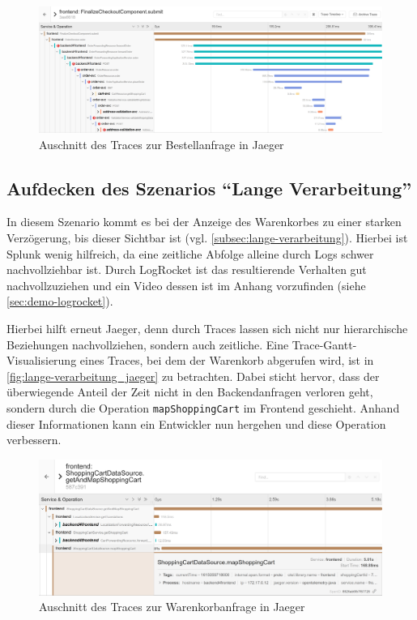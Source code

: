 \begin{figure}[H]
	\centering
	\includegraphics[width=1.00\linewidth]{img/05_ergebnis/ungueltige-adressen-sind-gueltig_jaeger-detail.png}
	\caption{Auschnitt des Traces zur Bestellanfrage in Jaeger}
	\label{fig:ungueltige-adressen-sind-gueltig_jaeger-detail}
\end{figure}

\subsection{Aufdecken des Szenarios \enquote{Lange Verarbeitung}}

In diesem Szenario kommt es bei der Anzeige des Warenkorbes zu einer starken Verzögerung, bis dieser Sichtbar ist (vgl. \autoref{subsec:lange-verarbeitung}). Hierbei ist Splunk wenig hilfreich, da eine zeitliche Abfolge alleine durch Logs schwer nachvollziehbar ist. Durch LogRocket ist das resultierende Verhalten gut nachvollzuziehen und ein Video dessen ist im Anhang vorzufinden (siehe \autoref{sec:demo-logrocket}).

Hierbei hilft erneut Jaeger, denn durch Traces lassen sich nicht nur hierarchische Beziehungen nachvollziehen, sondern auch zeitliche. Eine Trace-Gantt-Visualisierung eines Traces, bei dem der Warenkorb abgerufen wird, ist in \autoref{fig:lange-verarbeitung_jaeger} zu betrachten. Dabei sticht hervor, dass der überwiegende Anteil der Zeit nicht in den Backendanfragen verloren geht, sondern durch die Operation \texttt{mapShoppingCart} im Frontend geschieht. Anhand dieser Informationen kann ein Entwickler nun hergehen und diese Operation verbessern.

\begin{figure}[H]
	\centering
	\includegraphics[width=1.00\linewidth]{img/05_ergebnis/lange-verarbeitung_jaeger.png}
	\caption{Auschnitt des Traces zur Warenkorbanfrage in Jaeger}
	\label{fig:lange-verarbeitung_jaeger}
\end{figure}